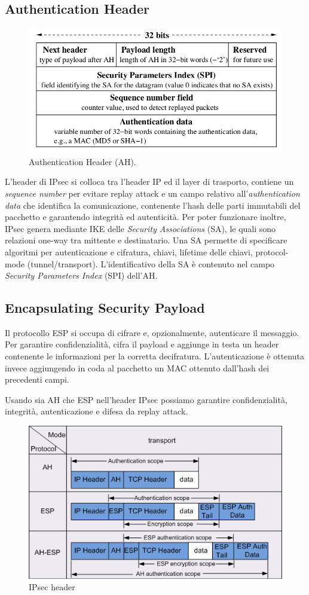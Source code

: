 \documentclass[a4paper, 11pt, twoside, openright, fleqn]{report}
\begin{document}
\subsection{Authentication Header}
\begin{figure}[htp]
	\centering
	\includegraphics[width=.8\textwidth]{images/AH}
	\caption{Authentication Header (AH).}
\end{figure}
L'header di IPsec si colloca tra l'header IP ed il layer di trasporto, contiene un \emph{sequence number} per evitare replay attack e un campo relativo all'\emph{authentication data} che identifica la comunicazione, contenente l'hash delle parti immutabili del pacchetto e garantendo integrità ed autenticità. Per poter funzionare inoltre, IPsec genera mediante IKE delle \emph{Security Associations} (SA), le quali sono relazioni one-way tra mittente e destinatario. Una SA permette di specificare algoritmi per autenticazione e cifratura, chiavi, lifetime delle chiavi, protocol-mode (tunnel/transport). L'identificativo della SA è contenuto nel campo \emph{Security Parameters Index} (SPI) dell'AH.

\subsection{Encapsulating Security Payload}
Il protocollo ESP si occupa di cifrare e, opzionalmente, autenticare il messaggio. Per garantire confidenzialità, cifra il payload e aggiunge in testa un header contenente le informazioni per la corretta decifratura. L'autenticazione è ottenuta invece aggiungendo in coda al pacchetto un MAC ottenuto dall'hash dei precedenti campi.

Usando sia AH che ESP nell'header IPsec possiamo garantire confidenzialità, integrità, autenticazione e difesa da replay attack.
\begin{figure}[htp]
	\centering
	\includegraphics[width=.95\textwidth]{images/IPsecHeader}
	\caption{IPsec header}
\end{figure}
\end{document}
